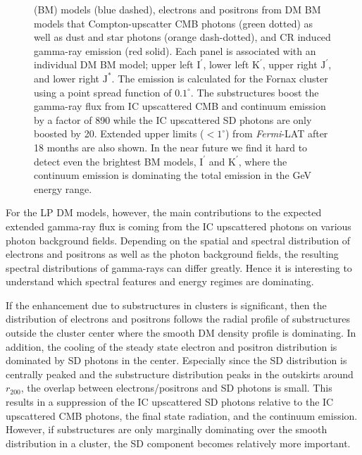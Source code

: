 \documentclass[10pt,aps,pra,reprint,amsmath,amsfonts,amssymb,showpacs,nofootinbib,floatfix]{revtex4-1}
\newcommand{\Fermi}{{\em Fermi}\xspace}
\newcommand{\rmn}{\mathrm}
\newcommand{\Kp}{\rmn{K}^\prime}
\newcommand{\Ip}{\rmn{I}^\prime}
\newcommand{\Js}{\rmn{J}^*}
\newcommand{\Jp}{\rmn{J}^\prime}
\newcommand{\degs}{^\circ}
\newcommand{\rvir}{r_{200}}
\begin{document}
\begin{figure}
\begin{minipage}{2.0\columnwidth}
{  (BM) models (blue dashed), electrons and positrons from DM BM models
  that Compton-upscatter CMB photons (green dotted) as well as dust
  and star photons (orange dash-dotted), and CR induced gamma-ray
  emission (red solid). Each panel is associated with an individual DM
  BM model; upper left $\Ip$, lower left $\Kp$, upper right $\Jp$, and
  lower right $\Js$. The emission is calculated for the Fornax cluster
  using a point spread function of $0.1\degs$. The substructures boost
  the gamma-ray flux from IC upscattered CMB and continuum emission by
  a factor of 890 while the IC upscattered SD photons are only boosted
  by 20. Extended upper limits ($<1^\circ$) from \Fermi-LAT after 18
  months \protect \cite{2010ApJ...717L..71A} are also shown. In the
  near future we find it hard to detect even the brightest BM models,
  $\Ip$ and $\Kp$, where the continuum emission is dominating the
  total emission in the GeV energy range.}
 \label{fig:diff_BM}
\end{minipage}
\end{figure}

For the LP DM models, however, the main contributions
to the expected extended gamma-ray flux is coming from the IC
upscattered photons on various photon background fields. Depending on
the spatial and spectral distribution of electrons and positrons as
well as the photon background fields, the resulting spectral
distributions of gamma-rays can differ greatly. Hence it is interesting
to understand which spectral features and energy regimes are
dominating.

If the enhancement due to substructures in clusters is significant,
then the distribution of electrons and positrons follows the radial
profile of substructures outside the cluster center where the smooth
DM density profile is dominating. In addition, the cooling of the
steady state electron and positron distribution is dominated by SD
photons in the center. Especially since the SD distribution is
centrally peaked and the substructure distribution peaks in the
outskirts around $\rvir$, the overlap between electrons/positrons and
SD photons is small. This results in a suppression of the IC
upscattered SD photons relative to the IC upscattered CMB photons, the
final state radiation, and the continuum emission. However, if
substructures are only marginally dominating over the smooth
distribution in a cluster, the SD component becomes relatively more
important.
\end{document}
